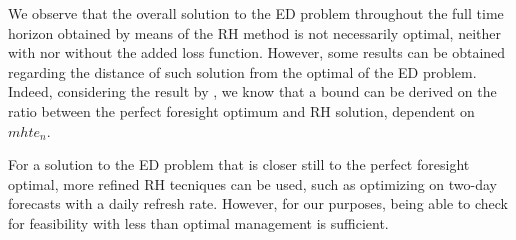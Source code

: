 \documentclass[smallextended,natbib]{svjour3}       %
\numberwithin{theorem}{section}
\begin{document}
We observe that the overall solution to the ED problem throughout the full time horizon obtained by means of the RH method is not necessarily optimal, neither with nor without the added loss function. 
However, some results can be obtained regarding the distance of such solution from the optimal of the ED problem. 
Indeed, considering the result by \citet{INTRO_Glomb}, we know that a bound can be derived on the ratio between the perfect foresight optimum and RH solution, dependent on $mhte_n$.

For a solution to the ED problem that is closer still to the perfect foresight optimal, more refined RH tecniques can be used, such as optimizing on two-day forecasts with a daily refresh rate.
However, for our purposes, being able to check for feasibility with less than optimal management is sufficient.



















\end{document}
